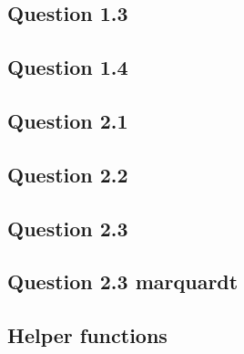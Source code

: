 \subsection{Question 1.3}\label{app:ex13}




\subsection{Question 1.4}\label{app:ex14}


\subsection{Question 2.1}\label{app:ex21}




\subsection{Question 2.2}\label{app:ex22}





\subsection{Question 2.3}\label{app:ex23}


\subsection{Question 2.3 marquardt}\label{app:ex23-marquardt}






\subsection{Helper functions}\label{app:helpers}



\pagebreak



